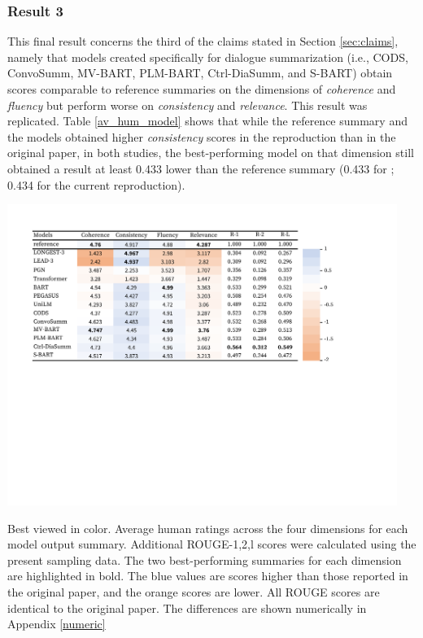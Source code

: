 \begin{table}[H]
         \label{cor_human_automatic}
\end{table}

\subsubsection{Result 3}

This final result concerns the third of the claims stated in Section \ref{sec:claims}, namely that models created specifically for dialogue summarization (i.e., CODS, ConvoSumm, MV-BART, PLM-BART, Ctrl-DiaSumm, and S-BART) obtain scores comparable to reference summaries on the dimensions of \textit{coherence} and \textit{fluency} but perform worse on \textit{consistency }and \textit{relevance}. This result was replicated. Table \ref{av_hum_model} shows that while the reference summary and the models obtained higher \textit{consistency} scores in the reproduction than in the original paper, in both studies, the best-performing model on that dimension still obtained a result at least 0.433 lower than the reference summary (0.433 for \citet{gao2022dialsummeval}; 0.434 for the current reproduction).


\begin{table}[H]
     \centering
         \includegraphics[clip, trim=1.5cm 10cm 4.5cm 1.0cm, width=0.95\textwidth]{figures/model_score_comp.pdf}
         \caption{Best viewed in color. Average human ratings across the four dimensions for each model output summary. Additional ROUGE-1,2,l scores were calculated using the present sampling data. The two best-performing summaries for each dimension are highlighted in bold. The blue values are scores higher than those reported in the original paper, and the orange scores are lower. All ROUGE scores are identical to the original paper. The differences are shown numerically in Appendix \ref{numeric}}
         \label{av_hum_model}
\end{table}



